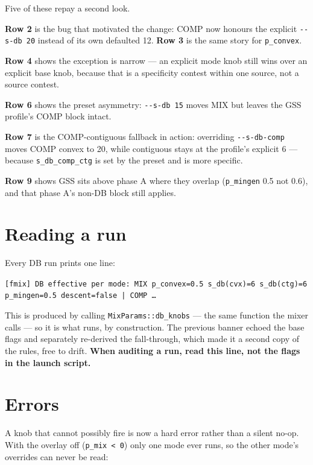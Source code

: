 \documentclass[11pt]{article}
\newcommand{\code}[1]{\texttt{#1}}
\begin{document}
Five of these repay a second look.

\textbf{Row 2} is the bug that motivated the change: COMP now honours the
explicit \code{-{}-s-db 20} instead of its own defaulted 12. \textbf{Row 3} is
the same story for \code{p\_convex}.

\textbf{Row 4} shows the exception is narrow --- an explicit mode knob still
wins over an explicit base knob, because that is a specificity contest within
one source, not a source contest.

\textbf{Row 6} shows the preset asymmetry: \code{-{}-s-db 15} moves MIX but
leaves the GSS profile's COMP block intact.

\textbf{Row 7} is the COMP-contiguous fallback in action: overriding
\code{-{}-s-db-comp} moves COMP convex to 20, while contiguous stays at the
profile's explicit 6 --- because \code{s\_db\_comp\_ctg} is set by the preset
and is more specific.

\textbf{Row 9} shows GSS sits above phase A where they overlap
(\code{p\_mingen} 0.5 not 0.6), and that phase A's non-DB block still applies.

\section{Reading a run}

Every DB run prints one line:

\begin{center}\footnotesize
\code{[fmix] DB effective per mode: MIX p\_convex=0.5 s\_db(cvx)=6 s\_db(ctg)=6 p\_mingen=0.5 descent=false | COMP \dots}
\end{center}

This is produced by calling \code{MixParams::db\_knobs} --- the same function
the mixer calls --- so it is what runs, by construction. The previous banner
echoed the base flags and separately re-derived the fall-through, which made it
a second copy of the rules, free to drift. \textbf{When auditing a run, read
this line, not the flags in the launch script.}

\section{Errors}

A knob that cannot possibly fire is now a hard error rather than a silent
no-op. With the overlay off (\code{p\_mix < 0}) only one mode ever runs, so
the other mode's overrides can never be read:
\end{document}
